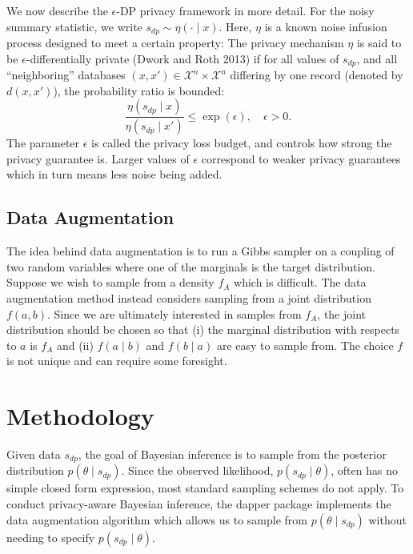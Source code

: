 We now describe the \(\epsilon\)-DP privacy framework in more detail. For the noisy summary
statistic, we write \(s_{dp} \sim \eta(\cdot \mid x)\). Here,
\(\eta\) is a known noise infusion process designed to meet a certain property: The privacy mechanism
\(\eta\) is said to be \(\epsilon\)-differentially private (Dwork and Roth 2013) if for all values of
\(s_{dp}\), and all ``neighboring'' databases \((x,x') \in \mathcal{X}^n \times \mathcal{X}^n\) differing
by one record (denoted by \(d(x,x')\)), the probability ratio is bounded:
\[
\dfrac{\eta(s_{dp} \mid x)}{\eta(s_{dp} \mid x')} \leq \exp(\epsilon), \quad \epsilon > 0.
\]
The parameter \(\epsilon\) is called the privacy loss budget, and controls how
strong the privacy guarantee is. Larger values of \(\epsilon\) correspond to weaker
privacy guarantees which in turn means less noise being added.

\hypertarget{data-augmentation}{%
\subsection{Data Augmentation}\label{data-augmentation}}

The idea behind data augmentation is to run a Gibbs sampler on a coupling of two random variables where one
of the marginals is the target distribution. Suppose we wish to sample from a density \(f_{A}\) which is difficult.
The data augmentation method instead considers sampling from a joint distribution \(f(a,b)\). Since
we are ultimately interested in samples from \(f_A\), the joint
distribution should be chosen so that (i) the marginal distribution
with respects to \(a\) is \(f_{A}\) and (ii) \(f(a \mid b)\) and \(f(b \mid a)\)
are easy to sample from. The choice \(f\) is not unique and can require
some foresight.

\hypertarget{methodology}{%
\section{Methodology}\label{methodology}}

Given data \(s_{dp}\), the goal of Bayesian inference is to sample from the
posterior distribution \(p(\theta \mid s_{dp})\). Since the observed likelihood,
\(p(s_{dp} \mid \theta)\), often has no simple closed form expression, most standard
sampling schemes do not apply. To conduct privacy-aware Bayesian inference, the dapper package implements
the data augmentation algorithm which allows us to sample from \(p(\theta \mid s_{dp})\)
without needing to specify \(p(s_{dp} \mid \theta)\).

